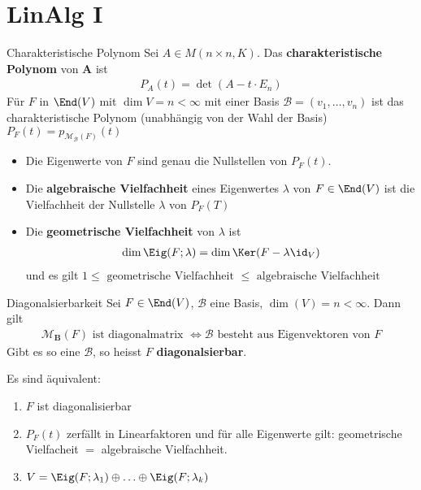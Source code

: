 \section{LinAlg I}

\begin{definition}{Charakteristische Polynom}
    Sei $A \in M(n\times n,K)$. Das \textbf{charakteristische Polynom} von $\mathbf{A}$ ist
    \begin{align*}
        P_A(t) = \det(A - t \cdot E_n)
    \end{align*}
    Für $F$ in $\End(V)$ mit $\dim V = n < \infty$ mit einer Basis $\mathcal{B} = (v_{1}, \ldots, v_{n})$ ist das charakteristische Polynom (unabhängig von der Wahl der Basis)
    $P_F(t) = p_{\mathcal{M}_{\mathcal{B}}(F)}(t)$
\end{definition}

\begin{itemize}
    \item   Die Eigenwerte von $F$ sind genau die Nullstellen von $P_F(t)$.
    \item   Die \textbf{algebraische Vielfachheit} eines Eigenwertes $\lambda$ von $F \in \End(V)$ ist die Vielfachheit der Nullstelle $\lambda$ von $P_F(T)$
    \item   Die \textbf{geometrische Vielfachheit} von $\lambda$ ist 
    \begin{align*}
        \dim \Eig(F;\lambda) = \dim \Ker(F - \lambda \id_V)
    \end{align*}
    und es gilt $1 \leq \text{ geometrische Vielfachheit } \leq \text{ algebraische Vielfachheit}$
\end{itemize}

\begin{proposition}{Diagonalsierbarkeit }
    Sei $F \in \End(V)$, $\mathcal{B}$ eine Basis, $\dim(V) = n < \infty$. Dann gilt
    \begin{align*}
        \mathcal{M}_{\mathbf{B}}(F) \text{ ist diagonalmatrix } \Leftrightarrow \mathcal{B} \text{ besteht aus Eigenvektoren von $F$}
    \end{align*}
    Gibt es so eine $\mathcal{B}$, so heisst $F$ \textbf{diagonalsierbar}. 
\end{proposition}
Es sind äquivalent:

\begin{enumerate}[{(}i{)}]
    \item   $F$ ist diagonalisierbar
    \item   $P_F(t)$ zerfällt in Linearfaktoren und für alle Eigenwerte gilt: geometrische Vielfacheit $=$ algebraische Vielfachheit.
    \item   $V = \Eig(F;\lambda_1) \oplus \ldots \oplus \Eig(F;\lambda_k)$
\end{enumerate}


